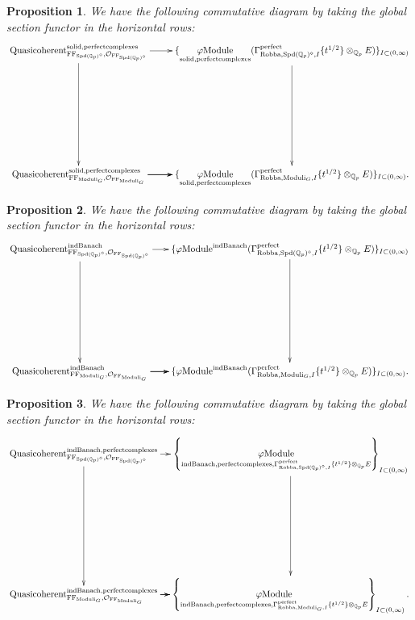 \documentclass[12pt]{book}
\newtheorem{proposition}{Proposition}
\theoremstyle{definition}
\begin{document}
\begin{proposition}
We have the following commutative diagram by taking the global section functor in the horizontal rows:\\
\[\displayindent=+0in
\xymatrix@R+7pc{
\mathrm{Quasicoherent}^{\mathrm{solid,perfectcomplexes}}_{\mathrm{FF}_{\mathrm{Spd}(\mathbb{Q}_p)^\diamond},\mathcal{O}_{\mathrm{FF}_{\mathrm{Spd}(\mathbb{Q}_p)^\diamond}}} \ar[r] \ar[d] &\{\underset{\mathrm{solid,perfectcomplexes}}{\varphi\mathrm{Module}}(\Gamma^\text{perfect}_{\text{Robba},{\mathrm{Spd}(\mathbb{Q}_p)^\diamond},I}\{t^{1/2}\}\otimes_{\mathbb{Q}_p}E)\}_{I\subset (0,\infty)} \ar[d]  \\
\mathrm{Quasicoherent}^{\mathrm{solid,perfectcomplexes}}_{\mathrm{FF}_{\mathrm{Moduli}_G},\mathcal{O}_{\mathrm{FF}_{\mathrm{Moduli}_G}}}  \ar[r] \ar[r] \ar[r] &\{\underset{\mathrm{solid,perfectcomplexes}}{\varphi\mathrm{Module}}(\Gamma^\text{perfect}_{\text{Robba},{\mathrm{Moduli}_G},I}\{t^{1/2}\}\otimes_{\mathbb{Q}_p}E)\}_{I\subset (0,\infty)}.   
}
\]
\end{proposition}

\begin{proposition}
We have the following commutative diagram by taking the global section functor in the horizontal rows:\\
\[\displayindent=+0in
\xymatrix@C-0.1in@R+7pc{
\mathrm{Quasicoherent}^{\mathrm{indBanach}}_{\mathrm{FF}_{\mathrm{Spd}(\mathbb{Q}_p)^\diamond},\mathcal{O}_{\mathrm{FF}_{\mathrm{Spd}(\mathbb{Q}_p)^\diamond}}} \ar[r] \ar[d] &\{\varphi\mathrm{Module}^\text{indBanach}(\Gamma^\text{perfect}_{\text{Robba},{\mathrm{Spd}(\mathbb{Q}_p)^\diamond},I}\{t^{1/2}\}\otimes_{\mathbb{Q}_p}E)\}_{I\subset (0,\infty)}\ar[d]\\
\mathrm{Quasicoherent}^{\mathrm{indBanach}}_{\mathrm{FF}_{\mathrm{Moduli}_G},\mathcal{O}_{\mathrm{FF}_{\mathrm{Moduli}_G}}}  \ar[r] \ar[r] \ar[r] &\{\varphi\mathrm{Module}^{\mathrm{indBanach}}(\Gamma^\text{perfect}_{\text{Robba},{\mathrm{Moduli}_G},I}\{t^{1/2}\}\otimes_{\mathbb{Q}_p}E)\}_{I\subset (0,\infty)}.    
}
\]
\end{proposition}

\begin{proposition}
We have the following commutative diagram by taking the global section functor in the horizontal rows:
\[\displayindent=+0in
\xymatrix@C-0.2in@R+7pc{
\mathrm{Quasicoherent}^{\mathrm{indBanach,perfectcomplexes}}_{\mathrm{FF}_{\mathrm{Spd}(\mathbb{Q}_p)^\diamond},\mathcal{O}_{\mathrm{FF}_{\mathrm{Spd}(\mathbb{Q}_p)^\diamond}}} \ar[d]\ar[r] &
\left\{\underset{\mathrm{indBanach,perfectcomplexes},\Gamma^\text{perfect}_{\text{Robba},\mathrm{Spd}(\mathbb{Q}_p)^\diamond,I}\{t^{1/2}\}\otimes_{\mathbb{Q}_p}E}{\varphi\mathrm{Module}}\right\}_{I\subset (0,\infty)}\ar[d]\\
\mathrm{Quasicoherent}^{\mathrm{indBanach,perfectcomplexes}}_{\mathrm{FF}_{\mathrm{Moduli}_G},\mathcal{O}_{\mathrm{FF}_{\mathrm{Moduli}_G}}}  \ar[r] \ar[r] \ar[r] &
\left\{\underset{\mathrm{indBanach,perfectcomplexes},\Gamma^\text{perfect}_{\text{Robba},\mathrm{Moduli}_G,I}\{t^{1/2}\}\otimes_{\mathbb{Q}_p}E}{\varphi\mathrm{Module}}\right\}_{I\subset (0,\infty)}.    
}
\]

\end{proposition}
\end{document}
